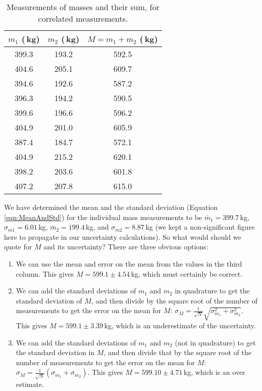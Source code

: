 \begin{table}[h]
\center
\begin{tabular}{ |c|c|c| }
  \hline
  \textbf{$m_1$ (\,kg)} & \textbf{$m_2$ (\,kg)} & \textbf{$M=m_1+m_2$ (\,kg)}\\
  \hline
  399.3 & 193.2& 592.5 \\ 
  \hline
  404.6 & 205.1& 609.7 \\ 
  \hline
  394.6 & 192.6& 587.2 \\ 
  \hline
  396.3 & 194.2& 590.5 \\ 
  \hline
  399.6 & 196.6& 596.2 \\ 
  \hline
  404.9 & 201.0& 605.9 \\ 
  \hline
  387.4 & 184.7& 572.1 \\ 
  \hline
  404.9 & 215.2& 620.1 \\ 
  \hline
  398.2 & 203.6& 601.8 \\ 
  \hline
  407.2 & 207.8& 615.0 \\ 
  \hline
\end{tabular}
\caption{\label{tab:massSum}Measurements of masses and their sum, for correlated measurements.}
\end{table}
We have determined the mean and the standard deviation (Equation \ref{eqn:MeanAndStd}) for the individual mass measurements to be $\bar m_1 = 399.7$\,kg, $ \sigma_{m1} = 6.01$\,kg, $\bar m_2=199.4$\,kg, and $\sigma_{m2} =  8.87$\,kg (we kept a non-significant figure here to propagate in our uncertainty calculations). So what would should we quote for $M$ and its uncertainty? There are three obvious options:
\begin{enumerate}
\item We can use the mean and error on the mean from the values in the third column. This gives $M=599.1 \pm 4.54$\,kg, which must certainly be correct.
\item We can add the standard deviations of $m_1$ and $m_2$ in quadrature to get the standard deviation of $M$, and then divide by the square root of the number of measurements to get the error on the mean for $M$: $\sigma_M=\frac{1}{\sqrt{N}}\sqrt{\sigma_{m_1}^2+\sigma_{m_2}^2}$. This gives $M= 599.1 \pm 3.39$\,kg, which is an underestimate of the uncertainty.
\item We can add the standard deviations of $m_1$ and $m_2$ (not in quadrature) to get the standard deviation in $M$, and then divide that by the square root of the number of measurements to get the error on the mean for $M$: $\sigma_M=\frac{1}{\sqrt{N}}(\sigma_{m_1}+\sigma_{m_2})$. This gives $M= 599.10 \pm 4.71$\,kg, which is an over estimate.
\end{enumerate}


